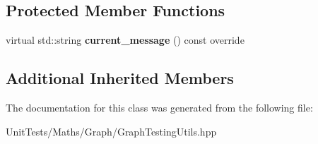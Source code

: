 \subsection*{Protected Member Functions}
\begin{DoxyCompactItemize}
\item 
\mbox{\label{classsequoia_1_1unit__testing_1_1graph__basic__test_a8a533e37856164a990989726e4f9a2f9}} 
virtual std\+::string {\bfseries current\+\_\+message} () const override
\end{DoxyCompactItemize}
\subsection*{Additional Inherited Members}


The documentation for this class was generated from the following file\+:\begin{DoxyCompactItemize}
\item 
Unit\+Tests/\+Maths/\+Graph/Graph\+Testing\+Utils.\+hpp\end{DoxyCompactItemize}

